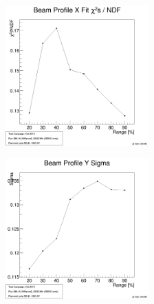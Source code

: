 \documentclass[9pt]{beamer}
\begin{document}
\begin{frame}
	\begin{center}
		\begin{minipage}{5.5cm}
			\centering
			\includegraphics[width=5.5cm]{BeamProfSigmasX}
		\end{minipage}
		\hspace*{2pt}
		\begin{minipage}{5.5cm}
			\centering
			\includegraphics[width=5.5cm]{BeamProfSigmasY}
		\end{minipage}\no\s
	\end{center}
\end{frame}
\end{document}
